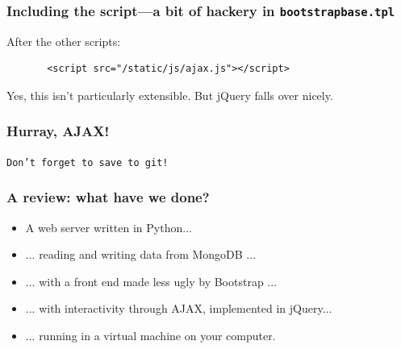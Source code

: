 \documentclass{beamer}
\begin{document}
\begin{frame}[fragile]
  \frametitle{Including the script---a bit of hackery in
    \texttt{bootstrapbase.tpl}}
  
  After the other scripts:
  \begin{verbatim}
       <script src="/static/js/ajax.js"></script>
  \end{verbatim}

  Yes, this isn't particularly extensible. But jQuery falls over
  nicely.
\end{frame}

\begin{frame}
  \frametitle{Hurray, AJAX!}

  \texttt{Don't forget to save to git!}
\end{frame}

\begin{frame}
  \frametitle{A review: what have we done?}
  \begin{itemize}
  \item A web server written in Python...
  \item ... reading and writing data from MongoDB ...
  \item ... with a front end made less ugly by Bootstrap ...
  \item ... with interactivity through AJAX, implemented in jQuery...
  \item ... running in a virtual machine on your computer.
  \end{itemize}
\end{frame}
\end{document}

